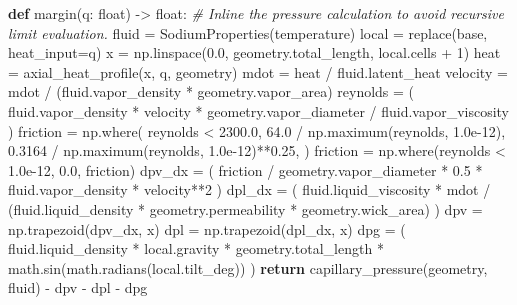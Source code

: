 \documentclass[
  12pt,
  12pt,a4paper,oneside]{report}
\newenvironment{Shaded}{}{}
\newcommand{\BuiltInTok}[1]{\textcolor[rgb]{0.00,0.50,0.00}{#1}}
\newcommand{\CommentTok}[1]{\textcolor[rgb]{0.38,0.63,0.69}{\textit{#1}}}
\newcommand{\ControlFlowTok}[1]{\textcolor[rgb]{0.00,0.44,0.13}{\textbf{#1}}}
\newcommand{\DecValTok}[1]{\textcolor[rgb]{0.25,0.63,0.44}{#1}}
\newcommand{\FloatTok}[1]{\textcolor[rgb]{0.25,0.63,0.44}{#1}}
\newcommand{\KeywordTok}[1]{\textcolor[rgb]{0.00,0.44,0.13}{\textbf{#1}}}
\newcommand{\NormalTok}[1]{#1}
\newcommand{\OperatorTok}[1]{\textcolor[rgb]{0.40,0.40,0.40}{#1}}
\begin{document}
\begin{Shaded}
\begin{Highlighting}[]
    \KeywordTok{def}\NormalTok{ margin(q: }\BuiltInTok{float}\NormalTok{) }\OperatorTok{{-}\textgreater{}} \BuiltInTok{float}\NormalTok{:}
        \CommentTok{\# Inline the pressure calculation to avoid recursive limit evaluation.}
\NormalTok{        fluid }\OperatorTok{=}\NormalTok{ SodiumProperties(temperature)}
\NormalTok{        local }\OperatorTok{=}\NormalTok{ replace(base, heat\_input}\OperatorTok{=}\NormalTok{q)}
\NormalTok{        x }\OperatorTok{=}\NormalTok{ np.linspace(}\FloatTok{0.0}\NormalTok{, geometry.total\_length, local.cells }\OperatorTok{+} \DecValTok{1}\NormalTok{)}
\NormalTok{        heat }\OperatorTok{=}\NormalTok{ axial\_heat\_profile(x, q, geometry)}
\NormalTok{        mdot }\OperatorTok{=}\NormalTok{ heat }\OperatorTok{/}\NormalTok{ fluid.latent\_heat}
\NormalTok{        velocity }\OperatorTok{=}\NormalTok{ mdot }\OperatorTok{/}\NormalTok{ (fluid.vapor\_density }\OperatorTok{*}\NormalTok{ geometry.vapor\_area)}
\NormalTok{        reynolds }\OperatorTok{=}\NormalTok{ (}
\NormalTok{            fluid.vapor\_density }\OperatorTok{*}\NormalTok{ velocity }\OperatorTok{*}\NormalTok{ geometry.vapor\_diameter}
            \OperatorTok{/}\NormalTok{ fluid.vapor\_viscosity}
\NormalTok{        )}
\NormalTok{        friction }\OperatorTok{=}\NormalTok{ np.where(}
\NormalTok{            reynolds }\OperatorTok{\textless{}} \FloatTok{2300.0}\NormalTok{,}
            \FloatTok{64.0} \OperatorTok{/}\NormalTok{ np.maximum(reynolds, }\FloatTok{1.0e{-}12}\NormalTok{),}
            \FloatTok{0.3164} \OperatorTok{/}\NormalTok{ np.maximum(reynolds, }\FloatTok{1.0e{-}12}\NormalTok{)}\OperatorTok{**}\FloatTok{0.25}\NormalTok{,}
\NormalTok{        )}
\NormalTok{        friction }\OperatorTok{=}\NormalTok{ np.where(reynolds }\OperatorTok{\textless{}} \FloatTok{1.0e{-}12}\NormalTok{, }\FloatTok{0.0}\NormalTok{, friction)}
\NormalTok{        dpv\_dx }\OperatorTok{=}\NormalTok{ (}
\NormalTok{            friction }\OperatorTok{/}\NormalTok{ geometry.vapor\_diameter}
            \OperatorTok{*} \FloatTok{0.5} \OperatorTok{*}\NormalTok{ fluid.vapor\_density }\OperatorTok{*}\NormalTok{ velocity}\OperatorTok{**}\DecValTok{2}
\NormalTok{        )}
\NormalTok{        dpl\_dx }\OperatorTok{=}\NormalTok{ (}
\NormalTok{            fluid.liquid\_viscosity }\OperatorTok{*}\NormalTok{ mdot}
            \OperatorTok{/}\NormalTok{ (fluid.liquid\_density }\OperatorTok{*}\NormalTok{ geometry.permeability }\OperatorTok{*}\NormalTok{ geometry.wick\_area)}
\NormalTok{        )}
\NormalTok{        dpv }\OperatorTok{=}\NormalTok{ np.trapezoid(dpv\_dx, x)}
\NormalTok{        dpl }\OperatorTok{=}\NormalTok{ np.trapezoid(dpl\_dx, x)}
\NormalTok{        dpg }\OperatorTok{=}\NormalTok{ (}
\NormalTok{            fluid.liquid\_density }\OperatorTok{*}\NormalTok{ local.gravity }\OperatorTok{*}\NormalTok{ geometry.total\_length}
            \OperatorTok{*}\NormalTok{ math.sin(math.radians(local.tilt\_deg))}
\NormalTok{        )}
        \ControlFlowTok{return}\NormalTok{ capillary\_pressure(geometry, fluid) }\OperatorTok{{-}}\NormalTok{ dpv }\OperatorTok{{-}}\NormalTok{ dpl }\OperatorTok{{-}}\NormalTok{ dpg}


\end{Highlighting}
\end{Shaded}
\end{document}
